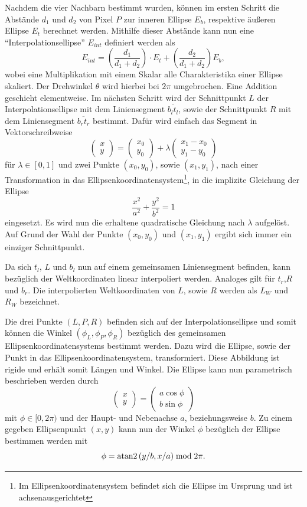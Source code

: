 Nachdem die vier Nachbarn bestimmt wurden, können im ersten Schritt die Abstände $d_1$ und $d_2$ von Pixel $P$ zur inneren Ellipse $E_b$, respektive äußeren Ellipse $E_t$ berechnet werden. Mithilfe dieser Abstände kann nun eine "`Interpolationsellipse"' $E_{int}$ definiert werden als
\[
	E_{int} = \left(\frac{d_1}{d_1 + d_2}\right) \cdot E_t + \left(\frac{d_2}{d_1 + d_2}\right) E_b,
\]
wobei eine Multiplikation mit einem Skalar alle Charakteristika einer Ellipse skaliert. Der Drehwinkel $\theta$ wird hierbei bei $2\pi$ umgebrochen. Eine Addition geschieht elementweise. Im nächsten Schritt wird der Schnittpunkt $L$ der Interpolationsellipse mit dem Liniensegment $\overline{b_lt_l}$, sowie der Schnittpunkt $R$ mit dem Liniensegment $\overline{b_rt_r}$ bestimmt. Dafür wird einfach das Segment in Vektorschreibweise
\[
\begin{pmatrix}
x \\ y
\end{pmatrix} = 
\begin{pmatrix}
x_0 \\ y_0
\end{pmatrix} + \lambda \begin{pmatrix}
x_1 - x_0 \\ y_1 - y_0
\end{pmatrix}
\] %
für $\lambda \in [0,1]$ und zwei Punkte $(x_0,y_0)$, sowie $(x_1,y_1)$, nach einer Transformation in das Ellipsenkoordinatensystem\footnote{Im Ellipsenkoordinatensystem befindet sich die Ellipse im Ursprung und ist achsenausgerichtet}, in die implizite Gleichung der Ellipse
\[
\frac{x^2}{a^2} + \frac{y^2}{b^2} = 1
\] %
eingesetzt.
Es wird nun die erhaltene quadratische Gleichung nach $\lambda$ aufgelöst. Auf Grund der Wahl der Punkte $(x_0,y_0)$ und $(x_1,y_1)$ ergibt sich immer ein einziger Schnittpunkt.

Da sich $t_l$, $L$ und $b_l$ nun auf einem gemeinsamen Liniensegment befinden, kann bezüglich der Weltkoordinaten linear interpoliert werden. Analoges gilt für $t_r$,$R$ und $b_r$.
Die interpolierten Weltkoordinaten von $L$, sowie $R$ werden als $L_W$ und $R_W$ bezeichnet.

Die drei Punkte $(L, P, R)$ befinden sich auf der Interpolationsellipse und somit können die  Winkel $(\phi_L, \phi_P, \phi_R)$ bezüglich des gemeinsamen Ellipsenkoordinatensystems bestimmt werden. Dazu wird die Ellipse, sowie der Punkt in das Ellipsenkoordinatensystem, transformiert. Diese Abbildung ist rigide und erhält somit Längen und Winkel. Die Ellipse kann nun parametrisch beschrieben werden durch
\[
\begin{pmatrix}x \\ y\end{pmatrix} = \begin{pmatrix}a\cos\phi \\
b\sin\phi\end{pmatrix}
\] %
mit $\phi \in [0, 2\pi)$ und der Haupt- und Nebenachse $a$, beziehungsweise $b$. Zu einem gegeben Ellipsenpunkt $(x,y)$ kann nun der Winkel $\phi$ bezüglich der Ellipse bestimmen werden mit
\[
\phi = \text{atan2}\left(y/b,x/a\right) \bmod 2\pi.
\] %

